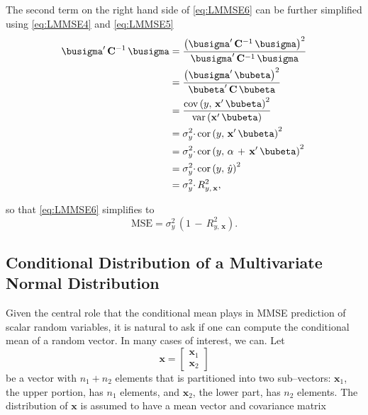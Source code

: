 \documentclass[graybox,envcountchap,sectrefs]{svmono}\usepackage[]{graphicx}\usepackage[]{xcolor}
\begin{document}
\begin{appendices}
The second term on the right hand side of \eqref{eq:LMMSE6} can be
further simplified using \eqref{eq:LMMSE4} and \eqref{eq:LMMSE5}
\begin{align}
\busigma^{\prime}\,\mathrm{\mathbf{C}^{-1}}\,\busigma & =\frac{\left(\busigma^{\prime}\,\mathrm{\mathbf{C}^{-1}}\,\busigma\right)^{2}}{\busigma^{\prime}\,\mathrm{\mathbf{C}^{-1}}\,\busigma}\nonumber \\
 & =\frac{\left(\busigma^{\prime}\,\bubeta\right)^{2}}{\bubeta^{\prime}\,\mathrm{\mathbf{C}}\,\bubeta}\nonumber \\
 & =\frac{\mathrm{cov}\left(y,\,\mathrm{\mathbf{x}}^{\prime}\,\bubeta\right)^{2}}{\mathrm{var}\left(\mathrm{\mathbf{x}}^{\prime}\,\bubeta\right)}\nonumber \\
 & =\sigma_{y}^{2}\cdotp\mathrm{cor}\left(y,\,\mathrm{\mathbf{x}}^{\prime}\,\bubeta\right)^{2}\nonumber \\
 & =\sigma_{y}^{2}\cdotp\mathrm{cor}\left(y,\,\alpha\,+\,\mathrm{\mathbf{x}}^{\prime}\,\bubeta\right)^{2}\nonumber \\
 & =\sigma_{y}^{2}\cdotp\mathrm{cor}\left(y,\,\hat{y}\right)^{2}\nonumber \\
 & =\sigma_{y}^{2}\cdotp R_{y,\,\mathbf{x}}^{2},\label{eq:eq:LMMSE8}
\end{align}

so that \eqref{eq:LMMSE6} simplifies to
\begin{equation}
\mathrm{MSE}=\sigma_{y}^{2}\,\left(1\,-\,R_{y,\,\mathbf{x}}^{2}\right).\label{eq:LMMSE9}
\end{equation}


\subsection{Conditional Distribution of a Multivariate Normal Distribution}

Given the central role that the conditional mean plays in MMSE prediction
of scalar random variables, it is natural to ask if one can compute
the conditional mean of a random vector. In many cases of interest,
we can. Let
\begin{equation}
\mathrm{\mathbf{x}}=\left[\begin{array}{c}
\mathrm{\mathbf{x}}_{1}\\
\hline \mathrm{\mathbf{x}}_{2}
\end{array}\right]\label{eq:MultivariateNormal1}
\end{equation}
be a vector with $n_{1}+n_{2}$ elements that is partitioned into
two sub--vectors: $\mathrm{\mathbf{x}}_{1}$, the upper portion,
has $n_{1}$ elements, and $\mathrm{\mathbf{x}}_{2}$, the lower part,
has $n_{2}$ elements. The distribution of $\mathbf{x}$ is assumed
to have a mean vector and covariance matrix


\end{appendices}
\end{document}
